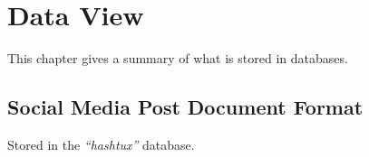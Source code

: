 \chapter{Data View}
This chapter gives a summary of what is stored in databases.

\section{Social Media Post Document Format}
Stored in the \textit{``hashtux''} database. \\ \\
